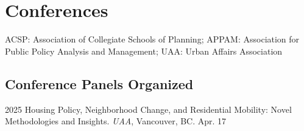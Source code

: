\documentclass[11pt,letterpaper]{article}
\begin{document}
\section{Conferences}
ACSP: Association of Collegiate Schools of Planning; APPAM: Association for Public Policy Analysis and Management; UAA: Urban Affairs Association

\subsection{Conference Panels Organized}
\begin{tablist}
  \item[2025] \tab{}Housing Policy, Neighborhood Change, and Residential Mobility: Novel Methodologies and Insights. \emph{UAA}, Vancouver, BC. Apr. 17
\end{tablist}
\end{document}
